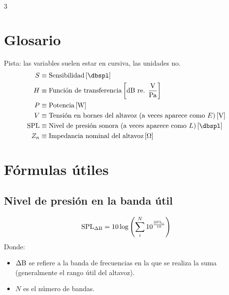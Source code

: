 \documentclass[a4paper, 8pt]{extarticle}
\begin{document}
\setlength{\parskip}{0pt}
\setlength{\parindent}{0pt}
\pagestyle{empty}
\renewcommand{\arraystretch}{1.5}

\begin{multicols}{3}
    \section{Glosario}
    Pista: las variables suelen estar en cursiva, las unidades no.
    \[
        \begin{alignedat}{2}
            S          & \equiv \text{Sensibilidad}  \left[ \unit{\dbspl} \right]                                                  \\
            H          & \equiv \text{Función de transferencia}  \left[ \unit{\dB} \text{ re. }\unit{\volt\per\pascal} \right]     \\
            P          & \equiv \text{Potencia} \left[ \unit{\watt} \right]                                                        \\
            V          & \equiv \text{Tensión en bornes del altavoz (a veces aparece como } E \text{)} \left[ \unit{\volt} \right] \\
            \text{SPL} & \equiv \text{Nivel de presión sonora (a veces aparece como } L \text{)} \left[ \unit{\dbspl} \right]      \\
            Z_n        & \equiv \text{Impedancia nominal del altavoz} \left[ \unit{\ohm} \right]                                   \\
        \end{alignedat}
    \]

    \section{Fórmulas útiles}
    \subsection{Nivel de presión en la banda útil}
    \[
        \text{SPL}_{\Delta \textup{B}} = 10 \log \left( \sum_{i}^{N} 10^{\frac{\text{SPL}_i}{10}} \right)
    \]
    \color{gray}Donde:
    \begin{itemize}
        \item $\Delta \textup{B}$ se refiere a la banda de frecuencias en la que se realiza la suma (generalmente el rango útil del altavoz).
        \item $N$ es el número de bandas.
    \end{itemize}\color{black}


\end{multicols}
\end{document}

